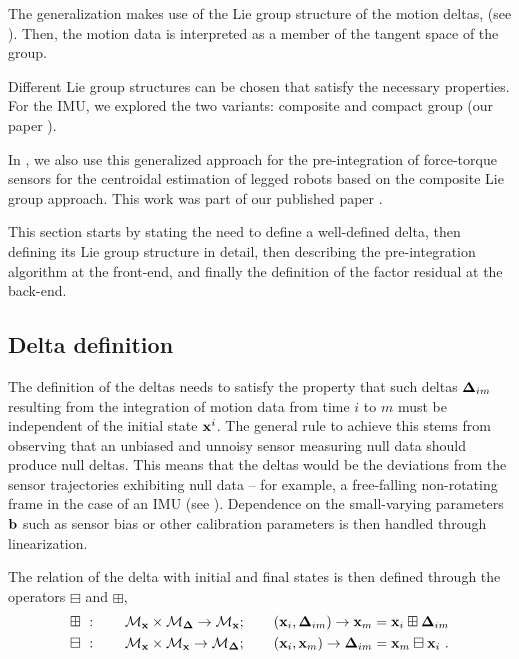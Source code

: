 The generalization makes use of the Lie group structure of the motion deltas, (see ). Then, the motion data is interpreted as a member of the tangent 
space of the group.

Different Lie group structures can be chosen that satisfy the necessary properties. For the IMU, we explored the two variants: composite \cite{forster2015imu} and 
compact group (our paper \cite{fourmy2019absolute}). 

In , we also use this generalized approach for the pre-integration of force-torque sensors for the centroidal estimation of legged robots 
based on the composite Lie group approach. This work was part of our published paper \cite{fourmy2021contact}.

\bigskip
This section starts by stating the need to define a well-defined delta, then defining its Lie group structure in detail, then describing the pre-integration algorithm at the front-end, and finally the definition of the factor residual at the back-end.


\subsection{Delta definition}

The definition of the deltas needs to satisfy the property that such deltas ${{\bm \Delta}}_{im}$ resulting from the integration of motion data from time $i$ to $m$ must 
be independent of the initial state ${\bf x}^i$. The general rule to achieve this stems from observing that an unbiased and unnoisy sensor measuring null data should 
produce null deltas. This means that the deltas would be the deviations from the sensor trajectories exhibiting null data -- for example, a free-falling non-rotating 
frame in  the case of an IMU (see ).
Dependence on the small-varying parameters ${\bf b}$ such as sensor bias or other calibration parameters is then handled through linearization.

The relation of the delta with initial and final states is then defined through the operators $\boxminus$ and $\boxplus$,
%
\begin{align}
    \boxplus~&: \quad\quad \mathcal{M}_{{\bf x}} \times \mathcal{M}_{{{\bm \Delta}}} \rightarrow \mathcal{M}_{{\bf x}}; 
    \quad\quad ({\bf x}_i,{{\bm \Delta}}_{im}) \rightarrow {\bf x}_m={\bf x}_i\boxplus {{\bm \Delta}}_{im} \label{eq:boxplus}\\
    \boxminus~&: \quad\quad \mathcal{M}_{{\bf x}} \times \mathcal{M}_{{\bf x}} \rightarrow \mathcal{M}_{{{\bm \Delta}}}; 
    \quad\quad ({\bf x}_i,{\bf x}_m) \rightarrow {{\bm \Delta}}_{im}={\bf x}_m\boxminus {\bf x}_i~.
    \label{eq:boxminus}
\end{align}
%

